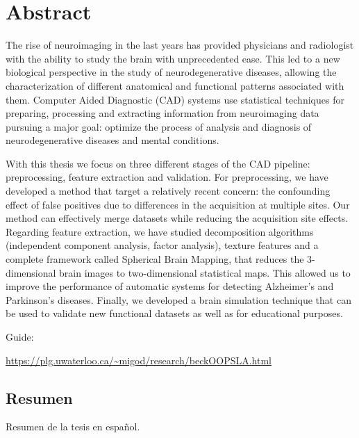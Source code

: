 \begingroup
\let\clearpage\relax
\let\cleardoublepage\relax
\let\cleardoublepage\relax

\chapter*{Abstract}
The rise of neuroimaging in the last years has provided physicians and radiologist with the ability to study the brain with unprecedented ease. This led to a new biological perspective in the study of neurodegenerative diseases, allowing the characterization of different anatomical and functional patterns associated with them. Computer Aided Diagnostic (CAD) systems use statistical techniques for preparing, processing and extracting information from neuroimaging data pursuing a major goal: optimize the process of analysis and diagnosis of neurodegenerative diseases and mental conditions.

With this thesis we focus on three different stages of the CAD pipeline: preprocessing, feature extraction and validation. For preprocessing, we have developed a method that target a relatively recent concern: the confounding effect of false positives due to differences in the acquisition at multiple sites. Our method can effectively merge datasets while reducing the acquisition site effects. Regarding feature extraction, we have studied decomposition algorithms (independent component analysis, factor analysis), texture features and a complete framework called Spherical Brain Mapping, that reduces the 3-dimensional brain images to two-dimensional statistical maps. This allowed us to improve the performance of automatic systems for detecting Alzheimer's and Parkinson's diseases. Finally, we developed a brain simulation technique that can be used to validate new functional datasets as well as for educational purposes. 

Guide: 
\begin{center}
	\url{https://plg.uwaterloo.ca/~migod/research/beckOOPSLA.html}
\end{center}

\begin{otherlanguage}{spanish}
\chapter*{Resumen}
Resumen de la tesis en español. 
\end{otherlanguage}

\endgroup			

\vfill